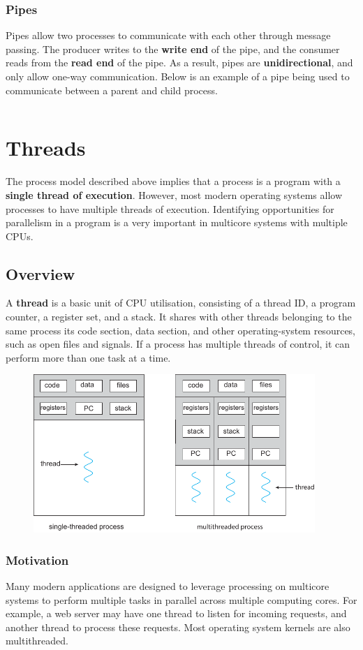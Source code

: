 \documentclass{article}
\begin{document}
\subsubsection{Pipes}
Pipes allow two processes to communicate with each other through
message passing. The producer writes to the \textbf{write end} of the
pipe, and the consumer reads from the \textbf{read end} of the pipe. As
a result, pipes are \textbf{unidirectional}, and only allow one-way
communication. Below is an example of a pipe being used to communicate
between a parent and child process.

\inputminted{c}{code/pipe.c}
\section{Threads}
The process model described above implies that a process is a program
with a \textbf{single thread of execution}. However, most modern
operating systems allow processes to have multiple threads of
execution. Identifying opportunities for parallelism in a program is a
very important in multicore systems with multiple CPUs.
\subsection{Overview}
A \textbf{thread} is a basic unit of CPU utilisation, consisting of a
thread ID, a program counter, a register set, and a stack. It shares
with other threads belonging to the same process its code section, data
section, and other operating-system resources, such as open files and
signals. If a process has multiple threads of control, it can perform
more than one task at a time.
\begin{figure}[H]
    \centering
    \includegraphics[height = 6cm]{figures/threads.pdf}
\end{figure}
\subsubsection{Motivation}
Many modern applications are designed to leverage processing on
multicore systems to perform multiple tasks in parallel across multiple
computing cores. For example, a web server may have one thread to
listen for incoming requests, and another thread to process these
requests. Most operating system kernels are also multithreaded.
\end{document}
